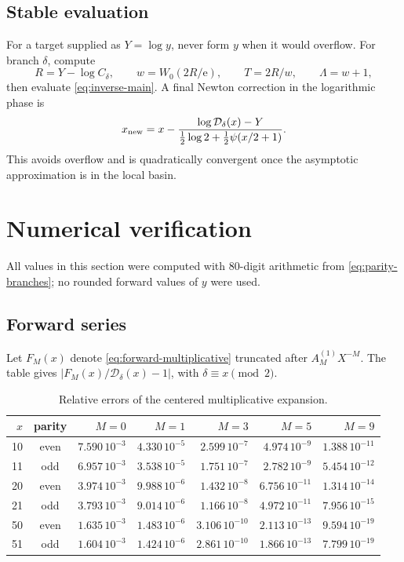 \documentclass[11pt,oneside]{article}
\theoremstyle{plain}
\theoremstyle{definition}
\theoremstyle{remark}
\newcommand{\e}{\mathrm e}
\newcommand{\DF}{\mathcal D}
\begin{document}
\subsection{Stable evaluation}

For a target supplied as \(Y=\log y\), never form \(y\) when it would overflow.
For branch \(\delta\), compute
\begin{equation}
 R=Y-\log C_\delta,
 \qquad w=W_0(2R/\e),
 \qquad T=2R/w,
 \qquad\Lambda=w+1,
 \label{eq:stable-evaluation}
\end{equation}
then evaluate \cref{eq:inverse-main}.  A final Newton correction in the
logarithmic phase is
\begin{equation}
 x_{\rm new}=x-
 \frac{\log\DF_\delta(x)-Y}
 {\tfrac12\log2+\tfrac12\psi(x/2+1)}.
 \label{eq:newton}
\end{equation}
This avoids overflow and is quadratically convergent once the asymptotic
approximation is in the local basin.

\section{Numerical verification}
\label{sec:numerics}

All values in this section were computed with 80-digit arithmetic from
\cref{eq:parity-branches}; no rounded forward values of \(y\) were used.

\subsection{Forward series}

Let \(F_M(x)\) denote \cref{eq:forward-multiplicative} truncated after
\(A_M^{(1)}X^{-M}\).  The table gives
\(|F_M(x)/\DF_\delta(x)-1|\), with \(\delta\equiv x\pmod2\).
\begin{table}[htbp]
\centering
\small
\begin{tabular}{rcrrrrr}
\toprule
\(x\)&parity&\(M=0\)&\(M=1\)&\(M=3\)&\(M=5\)&\(M=9\)\\
\midrule
10&even&\(7.590\,10^{-3}\)&\(4.330\,10^{-5}\)&\(2.599\,10^{-7}\)&\(4.974\,10^{-9}\)&\(1.388\,10^{-11}\)\\
11&odd &\(6.957\,10^{-3}\)&\(3.538\,10^{-5}\)&\(1.751\,10^{-7}\)&\(2.782\,10^{-9}\)&\(5.454\,10^{-12}\)\\
20&even&\(3.974\,10^{-3}\)&\(9.988\,10^{-6}\)&\(1.432\,10^{-8}\)&\(6.756\,10^{-11}\)&\(1.314\,10^{-14}\)\\
21&odd &\(3.793\,10^{-3}\)&\(9.014\,10^{-6}\)&\(1.166\,10^{-8}\)&\(4.972\,10^{-11}\)&\(7.956\,10^{-15}\)\\
50&even&\(1.635\,10^{-3}\)&\(1.483\,10^{-6}\)&\(3.106\,10^{-10}\)&\(2.113\,10^{-13}\)&\(9.594\,10^{-19}\)\\
51&odd &\(1.604\,10^{-3}\)&\(1.424\,10^{-6}\)&\(2.861\,10^{-10}\)&\(1.866\,10^{-13}\)&\(7.799\,10^{-19}\)\\
\bottomrule
\end{tabular}
\caption{Relative errors of the centered multiplicative expansion.}
\label{tab:forward-errors}
\end{table}
\end{document}

